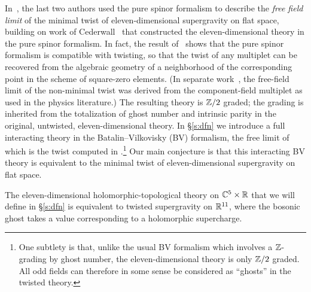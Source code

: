 In~\cite{SWspinor}, the last two authors used the pure spinor formalism to describe the {\em free field limit} of the minimal twist of eleven-dimensional supergravity on flat space, building on work of Cederwall~\cite{Ced-towards,Ced-11d} that constructed the eleven-dimensional theory in the pure spinor formalism. In fact, the result of~\cite{SWspinor} shows that the pure spinor formalism is compatible with twisting, so that the twist of any multiplet can be recovered from the algebraic geometry of a neighborhood of the corresponding point in the scheme of square-zero elements.
(In separate work~\cite{EagerHahner}, the free-field limit of the non-minimal twist was derived from the component-field multiplet as used in the physics literature.)
The resulting theory is $\mathbb Z/2$ graded; the grading is inherited from the totalization of ghost number and intrinsic parity in the original, untwisted, eleven-dimensional theory.
In \S\ref{s:dfn} we introduce a full interacting theory in the Batalin--Vilkovisky (BV) formalism, the free limit of which is the twist computed in \cite{SWspinor}.\footnote{One subtlety is that, unlike the usual BV formalism which involves a $\mathbb Z$-grading by ghost number, the eleven-dimensional theory is only $\mathbb Z/2$ graded.
All odd fields can therefore in some sense be considered as ``ghosts'' in the twisted theory.}
Our main conjecture is that this interacting BV theory is equivalent to the minimal twist of eleven-dimensional supergravity on flat space.

\begin{conj}
The eleven-dimensional  holomorphic-topological theory on $\mathbb C^5 \times \mathbb R$ that we will define in \S \ref{s:dfn} is equivalent to twisted supergravity on $\mathbb R^{11}$, where the bosonic ghost takes a value corresponding to a holomorphic supercharge. 
\end{conj}

